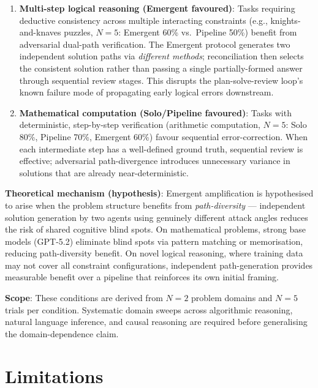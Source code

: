 \documentclass[12pt]{article}
\begin{document}
\begin{enumerate}
  \item \textbf{Multi-step logical reasoning (Emergent favoured)}: Tasks requiring
        deductive consistency across multiple interacting constraints
        (e.g., knights-and-knaves puzzles, $N=5$: Emergent 60\% vs.\ Pipeline 50\%)
        benefit from adversarial dual-path verification.
        The Emergent protocol generates two independent solution paths via
        \emph{different methods}; reconciliation then selects the consistent
        solution rather than passing a single partially-formed answer through
        sequential review stages. This disrupts the plan-solve-review loop's
        known failure mode of propagating early logical errors downstream.

  \item \textbf{Mathematical computation (Solo/Pipeline favoured)}: Tasks with
        deterministic, step-by-step verification (arithmetic computation, $N=5$:
        Solo 80\%, Pipeline 70\%, Emergent 60\%) favour sequential error-correction.
        When each intermediate step has a well-defined ground truth, sequential
        review is effective; adversarial path-divergence introduces unnecessary
        variance in solutions that are already near-deterministic.
\end{enumerate}

\noindent\textbf{Theoretical mechanism (hypothesis)}: Emergent amplification is
hypothesised to arise when the problem structure benefits from
\emph{path-diversity} --- independent solution generation by two agents using
genuinely different attack angles reduces the risk of shared cognitive blind spots.
On mathematical problems, strong base models (GPT-5.2) eliminate blind spots via
pattern matching or memorisation, reducing path-diversity benefit.
On novel logical reasoning, where training data may not cover all constraint
configurations, independent path-generation provides measurable benefit over a
pipeline that reinforces its own initial framing.

\noindent\textbf{Scope}: These conditions are derived from $N=2$ problem domains
and $N=5$ trials per condition. Systematic domain sweeps across algorithmic
reasoning, natural language inference, and causal reasoning are required before
generalising the domain-dependence claim.

\section{Limitations}\label{sec:limitations}
\end{document}
